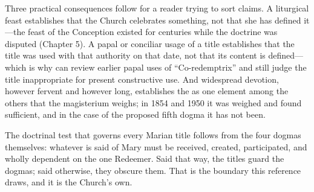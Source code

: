 Three practical consequences follow for a reader trying to sort claims.
A liturgical feast establishes that the Church celebrates something, not
that she has defined it---the feast of the Conception existed for
centuries while the doctrine was disputed (Chapter 5). A papal or
conciliar usage of a title establishes that the title was used with that
authority on that date, not that its content is defined---which is why
 can review earlier papal uses of
``Co-redemptrix'' and still judge the title inappropriate for present
constructive use. And widespread devotion, however fervent and however
long, establishes the  as one element among the
others that the magisterium weighs; in 1854 and 1950 it was weighed and
found sufficient, and in the case of the proposed fifth dogma it has not
been.

The doctrinal test that governs every Marian title follows from the four
dogmas themselves: whatever is said of Mary must be received, created,
participated, and wholly dependent on the one Redeemer. Said that way,
the titles guard the dogmas; said otherwise, they obscure them. That is
the boundary this reference draws, and it is the Church's own.
